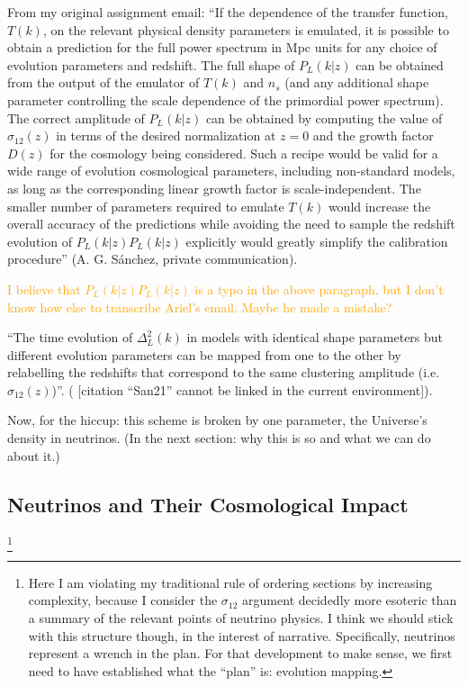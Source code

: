 \documentclass[11pt]{article}
\newcommand{\cbib}[1]
{\IfFileExists{biblatex.sty}
{\cite{#1}}
{[citation ``#1'' cannot be linked in the current environment]}}
\begin{document}
From my original assignment email:
``If the dependence of the transfer function, $T(k)$, on the relevant physical
density parameters is emulated, it is possible to obtain a prediction for the
full power spectrum in Mpc units for any choice of evolution parameters and
redshift. The full shape of $P_L(k|z)$ can be obtained from the output of the
emulator of $T(k)$ and $n_s$ (and any additional shape parameter controlling
the scale dependence of the primordial power spectrum). The correct amplitude
of $P_L(k|z)$ can be obtained by computing the value of $\sigma_{12}(z)$ in
terms of the desired normalization at $z=0$ and the growth factor $D(z)$ for
the cosmology being considered. Such a recipe would be valid for a wide range
of evolution cosmological parameters, including non-standard models, as long as
the corresponding linear growth factor is scale-independent. The smaller number
of parameters required to emulate $T(k)$ would increase the overall accuracy of
the predictions while avoiding the need to sample the redshift evolution of
$P_L(k|z) P_L(k|z)$ explicitly would greatly simplify the calibration
procedure'' (A. G. S\'{a}nchez, private communication).

\textcolor{orange}{I believe that $P_L(k|z) P_L(k|z)$ is a typo in the above
paragraph, but I don't know how else to transcribe Ariel's email. Maybe he
made a mistake?}

``The time evolution of $\Delta_L^2(k)$ in models with identical shape
parameters
but different evolution parameters can be mapped from one to the other by
relabelling the redshifts that correspond to the same clustering amplitude
(i.e. $\sigma_{12}(z)$)''.
(\cbib{San21}).

Now, for the hiccup: this scheme is broken by one parameter, the Universe's
density in neutrinos. (In the next section: why this is so and what we can do
about it.)

\begin{centering}
\section{Neutrinos and Their Cosmological Impact}
\end{centering}

\footnote{
    Here I am violating my traditional rule of ordering sections by
    increasing complexity, because I consider the $\sigma_{12}$ argument
    decidedly more esoteric than a summary of the relevant points of neutrino
    physics. I think we should stick with this structure though, in the
    interest of narrative. Specifically, neutrinos represent a wrench in the
    plan. For that development to make sense, we first need to have established
    what
    the ``plan'' is: evolution mapping.
}
\end{document}
